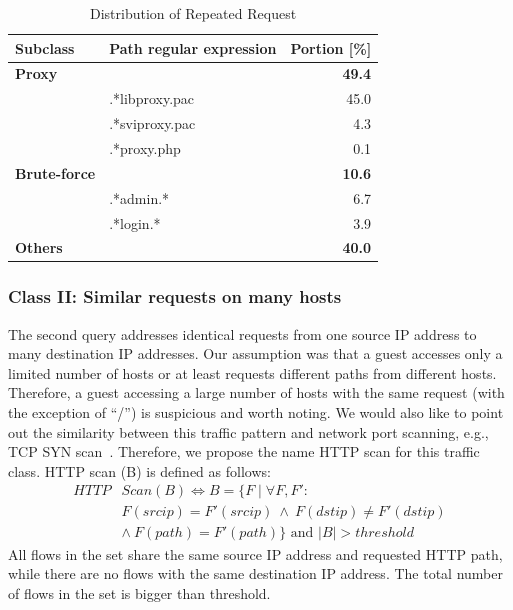 \begin{table}[ht]
\centering
\begin{tabular}{l l r}
Subclass & Path regular expression & Portion [\%] \\
\hline
\textbf{Proxy} & & \textbf{49.4} \\
& .*libproxy.pac & 45.0 \\
& .*sviproxy.pac &  4.3 \\
& .*proxy.php    &  0.1 \\
\hline
\textbf{Brute-force} & & \textbf{10.6} \\
& .*admin.*            &  6.7 \\
& .*login.*            &  3.9 \\
\hline
\textbf{Others} & & \textbf{40.0} \\
\end{tabular}
\caption{Distribution of Repeated Request}
\label{tab:httpsecurity-repeat-statistics}
\end{table}

\subsubsection{Class II: Similar requests on many hosts}

The second query addresses identical requests from one source IP address to many destination IP addresses. Our assumption was that a guest accesses only a limited number of hosts or at least requests different paths from different hosts. Therefore, a guest accessing a large number of hosts with the same request (with the exception of ``/'') is suspicious and worth noting. We would also like to point out the similarity between this traffic pattern and network port scanning, e.g., TCP SYN scan~\cite{Bhuyan-2011-Surveying}. Therefore, we propose the name HTTP scan for this traffic class. HTTP scan (B) is defined as follows:
\begin{equation*}
\begin{split}
HTTP&Scan(B) \iff B = \{F \mid \forall F, F':\\
&F(srcip) = F'(srcip) \: \land \: F(dstip) \neq F'(dstip)\\
&\land \: F(path) = F'(path) \} \mbox{ and } |B| > threshold
\end{split}
\end{equation*}
All flows in the set share the same source IP address and requested HTTP path, while there are no flows with the same destination IP address. The total number of flows in the set is bigger than threshold.

